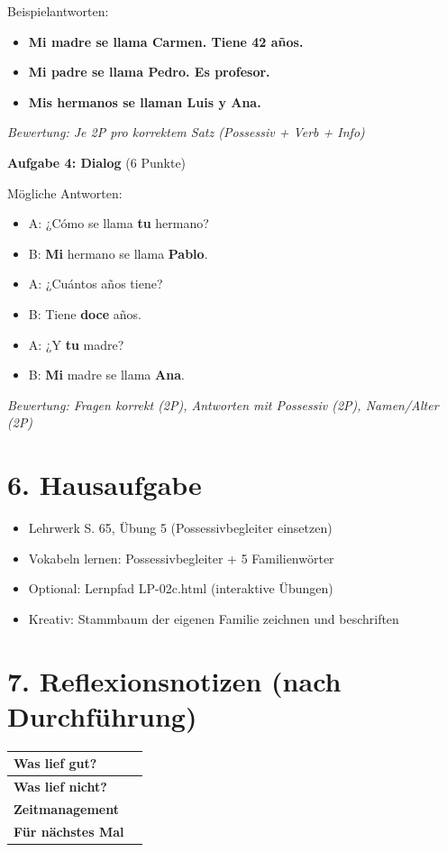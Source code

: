 \documentclass[11pt, a4paper]{article}
\newcommand{\sequenz}{02}
\newcommand{\block}{c}
\newcommand{\loesung}[1]{\textcolor{loesung}{\textbf{#1}}}
\begin{document}
Beispielantworten:
\begin{itemize}
    \item \loesung{Mi madre se llama Carmen. Tiene 42 años.}
    \item \loesung{Mi padre se llama Pedro. Es profesor.}
    \item \loesung{Mis hermanos se llaman Luis y Ana.}
\end{itemize}

\textit{Bewertung: Je 2P pro korrektem Satz (Possessiv + Verb + Info)}

\vspace{1em}

\textbf{Aufgabe 4: Dialog} (6 Punkte)

Mögliche Antworten:
\begin{itemize}
    \item A: ¿Cómo se llama \loesung{tu} hermano?
    \item B: \loesung{Mi} hermano se llama \loesung{Pablo}.
    \item A: ¿Cuántos años tiene?
    \item B: Tiene \loesung{doce} años.
    \item A: ¿Y \loesung{tu} madre?
    \item B: \loesung{Mi} madre se llama \loesung{Ana}.
\end{itemize}

\textit{Bewertung: Fragen korrekt (2P), Antworten mit Possessiv (2P), Namen/Alter (2P)}


\section*{6. Hausaufgabe}

\begin{itemize}
    \item Lehrwerk S. 65, Übung 5 (Possessivbegleiter einsetzen)
    \item Vokabeln lernen: Possessivbegleiter + 5 Familienwörter
    \item Optional: Lernpfad LP-\sequenz\block.html (interaktive Übungen)
    \item Kreativ: Stammbaum der eigenen Familie zeichnen und beschriften
\end{itemize}


\section*{7. Reflexionsnotizen (nach Durchführung)}

\begin{tabularx}{\textwidth}{|l|X|}
\hline
\textbf{Was lief gut?} & \\[2em]
\hline
\textbf{Was lief nicht?} & \\[2em]
\hline
\textbf{Zeitmanagement} & \\[2em]
\hline
\textbf{Für nächstes Mal} & \\[2em]
\hline
\end{tabularx}
\end{document}
